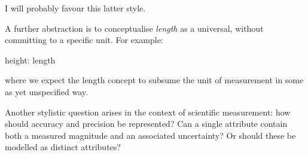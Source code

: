 I will probably favour this latter style.

A further abstraction is to conceptualise \textit{length} as a universal, without committing to a specific unit. For example:

\begin{erquote}
height: length
\end{erquote}
where we expect the length concept to subsume the unit of measurement in some as yet unspecified way. 

Another stylistic question arises in the context of scientific measurement: how should accuracy and precision be represented? Can a single attribute contain both a measured magnitude and an associated uncertainty? Or should these be modelled as distinct attributes?
















